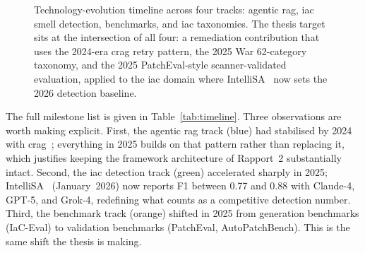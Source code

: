 \documentclass[12pt, a4paper]{report}
\begin{document}
\begin{figure}[H]
{
  }
  \caption{Technology-evolution timeline across four tracks: agentic
    \gls{rag}, \gls{iac} smell detection, benchmarks, and \gls{iac}
    taxonomies. The thesis target sits at the intersection of all four:
    a remediation contribution that uses the 2024-era \gls{crag} retry
    pattern, the 2025 War 62-category taxonomy, and the
    2025 PatchEval-style scanner-validated evaluation, applied to the
    \gls{iac} domain where IntelliSA~\citep{intellisa2026} now sets the
    2026 detection baseline.}
  \label{fig:timeline}
\end{figure}

The full milestone list is given in Table~\ref{tab:timeline}. Three
observations are worth making explicit. First, the agentic \gls{rag} track
(blue) had stabilised by 2024 with \gls{crag}~\citep{yao2024crag}; everything
in 2025 builds on that pattern rather than replacing it, which justifies
keeping the framework architecture of Rapport~2 substantially intact.
Second, the \gls{iac} detection track (green) accelerated sharply in 2025;
IntelliSA~\citep{intellisa2026} (January~2026) now reports F1 between 0.77
and 0.88 with Claude-4, GPT-5, and Grok-4, redefining what counts as a
competitive detection number. Third, the benchmark track (orange) shifted
in 2025 from generation benchmarks (IaC-Eval) to validation benchmarks
(PatchEval, AutoPatchBench). This is the same shift the thesis is making.
\end{document}
